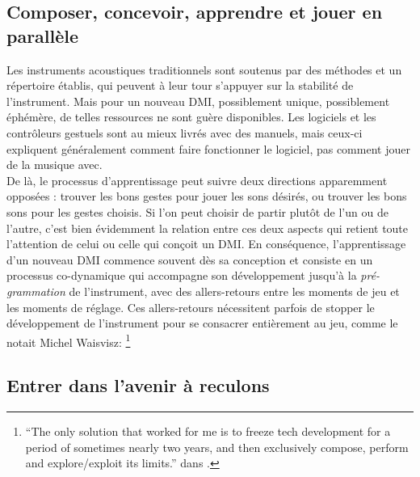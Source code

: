 \subsection{Composer, concevoir, apprendre et jouer en parallèle}

\noindent Les instruments acoustiques traditionnels sont soutenus par des méthodes et un répertoire établis, qui peuvent à leur tour s'appuyer sur la stabilité de l'instrument. Mais pour un nouveau \gls{DMI}, possiblement unique, possiblement éphémère, de telles ressources ne sont guère disponibles. Les logiciels et les contrôleurs gestuels sont au mieux livrés avec des manuels, mais ceux-ci expliquent généralement comment faire fonctionner le logiciel, pas comment jouer de la musique avec.\\
\indent De là, le processus d'apprentissage peut suivre deux directions apparemment opposées : trouver les bons gestes pour jouer les sons désirés, ou trouver les bons sons pour les gestes choisis. Si l'on peut choisir de partir plutôt de l'un ou de l'autre, c'est bien évidemment la relation entre ces deux aspects qui retient toute l'attention de celui ou celle qui conçoit un \gls{DMI}. En conséquence, l'apprentissage d'un nouveau \gls{DMI} commence souvent dès sa conception et consiste en un processus co-dynamique qui accompagne son développement jusqu'à la \textit{pré-grammation} de l'instrument, avec des allers-retours entre les moments de jeu et les moments de réglage. Ces allers-retours nécessitent parfois de stopper le développement de l'instrument pour se consacrer entièrement au jeu, comme le notait Michel Waisvisz: \footnote{``The only solution that worked for me is to freeze tech development for a period of sometimes nearly two years, and then exclusively compose, perform and explore/exploit its limits.'' dans \cite{wanderley_trends_2000}.}

\subsection{Entrer dans l'avenir à reculons}

